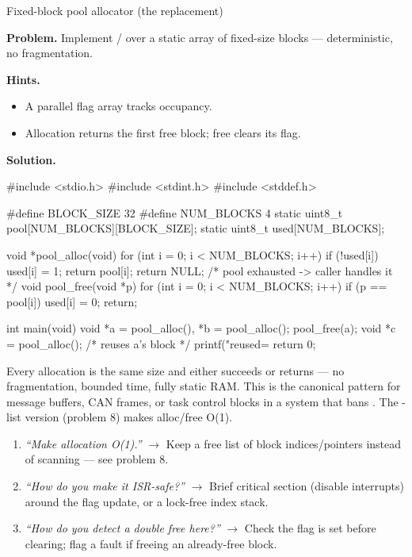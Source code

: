 \begin{gymproblem}{Fixed-block pool allocator (the  replacement)}

\textbf{Problem.} Implement / over a static
array of fixed-size blocks --- deterministic, no fragmentation.

\textbf{Hints.}
\begin{itemize}
\item A parallel  flag array tracks occupancy.
\item Allocation returns the first free block; free clears its flag.
\end{itemize}

\attempt

\textbf{Solution.}
\begin{cgym}
#include <stdio.h>
#include <stdint.h>
#include <stddef.h>

#define BLOCK_SIZE 32
#define NUM_BLOCKS 4
static uint8_t pool[NUM_BLOCKS][BLOCK_SIZE];
static uint8_t used[NUM_BLOCKS];

void *pool_alloc(void) {
    for (int i = 0; i < NUM_BLOCKS; i++)
        if (!used[i]) { used[i] = 1; return pool[i]; }
    return NULL;                       /* pool exhausted -> caller handles it */
}
void pool_free(void *p) {
    for (int i = 0; i < NUM_BLOCKS; i++)
        if (p == pool[i]) { used[i] = 0; return; }
}

int main(void) {
    void *a = pool_alloc(), *b = pool_alloc();
    pool_free(a);
    void *c = pool_alloc();            /* reuses a's block */
    printf("reused=%
    return 0;
}
\end{cgym}

Every allocation is the same size and either succeeds or returns  ---
no fragmentation, bounded time, fully static RAM. This is the canonical pattern
for message buffers, CAN frames, or task control blocks in a system that bans
. The -list version (problem 8) makes alloc/free O(1).

\followups
\begin{enumerate}
\item \emph{``Make allocation O(1).''} $\rightarrow$ Keep a free list of block
  indices/pointers instead of scanning  --- see problem 8.
\item \emph{``How do you make it ISR-safe?''} $\rightarrow$ Brief critical
  section (disable interrupts) around the flag update, or a lock-free index
  stack.
\item \emph{``How do you detect a double free here?''} $\rightarrow$ Check the
  flag is set before clearing; flag a fault if freeing an already-free block.
\end{enumerate}
\end{gymproblem}

